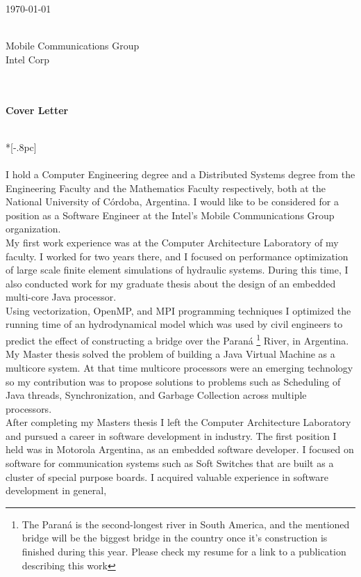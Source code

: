 \documentclass[letter,12pt,english]{article}
\begin{document}
{ \hfill \today \\ \\ 



{
\raggedright{}
Mobile Communications Group \\
Intel Corp
}
\\
\\
\large
\bf Cover Letter} \\*[-.8pc]
\\
\\
I hold a Computer Engineering degree and a Distributed Systems degree from the Engineering Faculty
and the Mathematics Faculty respectively, both at the National University of C\'ordoba, Argentina.
I would like to be considered for a position as a Software Engineer at the Intel's Mobile Communications Group
organization.
\\
My first work experience was at the Computer Architecture Laboratory of my faculty. I worked for two
years there, and I focused on performance optimization of large scale finite element simulations of 
hydraulic systems. During this time, I also conducted work for my graduate thesis about the design
of an embedded multi-core Java processor.\\
Using vectorization, OpenMP, and MPI programming techniques I optimized the running time of an 
hydrodynamical model which was used by civil engineers to predict the effect of constructing a bridge
over the Paran\'a
\footnote{The Paran\'a is the second-longest river in South America, and the mentioned bridge
will be the biggest bridge in the country once it's construction is finished during this year. Please
check my resume for a link to a publication describing this work} River,
in Argentina. \\
My Master thesis solved the problem of building a Java Virtual Machine as a multicore system. At that time
multicore processors were an emerging technology so my contribution was to propose solutions to 
problems such as Scheduling of Java threads, Synchronization, and Garbage Collection across multiple
processors. \\
After completing my Masters thesis I left the Computer Architecture Laboratory and pursued a career
in software development in industry. The first position I held was in Motorola Argentina, as an embedded
software developer. I focused on software for communication systems such as Soft Switches that are built
as a cluster of special purpose boards. I acquired valuable experience in software development in general,
\end{document}
